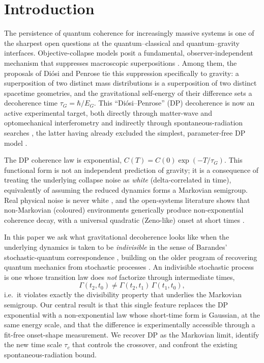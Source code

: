 \documentclass[aps,pra,preprint,amsmath,amssymb,nofootinbib,superscriptaddress]{revtex4-2}
\begin{document}
\section{Introduction}

The persistence of quantum coherence for increasingly massive systems is one of
the sharpest open questions at the quantum--classical and quantum--gravity
interfaces. Objective-collapse models posit a fundamental, observer-independent
mechanism that suppresses macroscopic superpositions
\cite{grw1986,csl1990,bassighirardi2003,bassi2013}. Among them, the proposals of
Di\'osi \cite{diosi1989,diosi1987} and Penrose \cite{penrose1996} tie this
suppression specifically to gravity: a superposition of two distinct mass
distributions is a superposition of two distinct spacetime geometries, and the
gravitational self-energy of their difference sets a decoherence time
$\tau_G=\hbar/E_G$. This ``Di\'osi--Penrose'' (DP) decoherence is now an active
experimental target, both directly through matter-wave and optomechanical
interferometry \cite{arndt2014,marshall2003,nimmrichter2013} and indirectly
through spontaneous-radiation searches \cite{donadi2021,adler2013}, the latter
having already excluded the simplest, parameter-free DP model
\cite{donadi2021}.

The DP coherence law is exponential, $C(T)=C(0)\exp(-T/\tau_G)$. This functional
form is not an independent prediction of gravity; it is a consequence of treating
the underlying collapse noise as \emph{white} (delta-correlated in time),
equivalently of assuming the reduced dynamics forms a Markovian semigroup. Real
physical noise is never white \cite{carlesso2018}, and the open-systems
literature shows that non-Markovian (coloured) environments generically produce
non-exponential coherence decay, with a universal quadratic (Zeno-like) onset at
short times \cite{breuerbook2002,breuer2016,misra1977}.

In this paper we ask what gravitational decoherence looks like when the
underlying dynamics is taken to be \emph{indivisible} in the sense of Barandes'
stochastic-quantum correspondence \cite{barandes2023corr,barandes2023thm},
building on the older program of recovering quantum mechanics from stochastic
processes \cite{nelson1966}. An indivisible stochastic process is one whose
transition law does \emph{not} factorize through intermediate times,
\begin{equation}
\Gamma(t_2,t_0)\neq\Gamma(t_2,t_1)\,\Gamma(t_1,t_0),
\end{equation}
i.e.\ it violates exactly the divisibility property that underlies the Markovian
semigroup. Our central result is that this single feature replaces the DP
exponential with a non-exponential law whose short-time form is Gaussian, at the
same energy scale, and that the difference is experimentally accessible through a
fit-free onset-shape measurement. We recover DP as the Markovian limit, identify
the new time scale $\tau_c$ that controls the crossover, and confront the
existing spontaneous-radiation bound.
\end{document}

